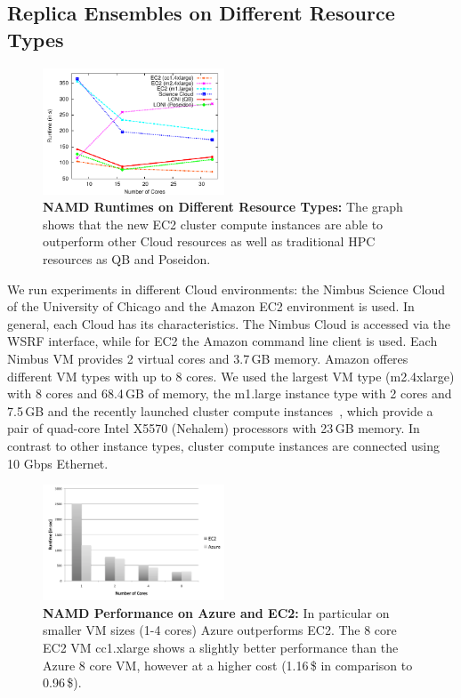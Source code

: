 \documentclass[conference,final]{IEEEtran}
\begin{document}
\subsection{Replica Ensembles on Different Resource Types}
\label{sec:performance_namd}
\begin{figure}[htbp]
    \centering
        \includegraphics[width=0.48\textwidth]{performance/namd_run}
    \caption{\textbf{NAMD Runtimes on Different Resource Types: } The
          graph shows that the new EC2 cluster compute instances are 
          able to outperform other Cloud resources as well as traditional
          HPC resources as QB and Poseidon.}
    \label{fig:performance_namd_run}
\end{figure}

We run experiments in different Cloud environments: the Nimbus Science 
Cloud of the University of Chicago and the Amazon EC2 environment is used. In general, each Cloud has 
its characteristics. The Nimbus Cloud is accessed via the WSRF
interface, while for EC2 the Amazon command line client is used. 
Each Nimbus VM provides 2 virtual cores and 3.7\,GB memory. 
Amazon offeres different VM types with up to 8 cores. We used the largest 
VM type (m2.4xlarge) with 8 cores and 68.4\,GB of memory,
the m1.large instance type with 2 cores and 7.5\,GB  and the recently launched
cluster compute instances~\cite{ec2-cc}, which provide a pair of quad-core Intel 
X5570 (Nehalem) processors with 23\,GB memory. In contrast to other instance types,
cluster compute instances are connected using 10 Gbps Ethernet.


\begin{figure}[htbp]
    \centering
        \includegraphics[width=0.48\textwidth]{performance/namd_ec2_azure.pdf}
    \caption{\textbf{NAMD Performance on Azure and EC2:} In particular on smaller VM sizes (1-4 cores) Azure 
    outperforms EC2. The 8 core EC2 VM cc1.xlarge shows a slightly better performance than the Azure 8 core VM,
    however at a higher cost (1.16\,\$ in comparison to 0.96\,\$).}
    \label{fig:performance_namd_ec2_azure}
\end{figure}
\end{document}
